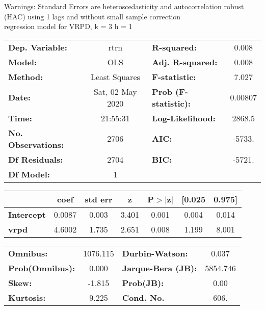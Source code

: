 Warnings: \newline
 [1] Standard Errors are heteroscedasticity and autocorrelation robust (HAC) using 1 lags and without small sample correction\\ 

regression model for VRPD, k = 3 h = 1\begin{center}
\begin{tabular}{lclc}
\toprule
\textbf{Dep. Variable:}    &       rtrn       & \textbf{  R-squared:         } &     0.008   \\
\textbf{Model:}            &       OLS        & \textbf{  Adj. R-squared:    } &     0.008   \\
\textbf{Method:}           &  Least Squares   & \textbf{  F-statistic:       } &     7.027   \\
\textbf{Date:}             & Sat, 02 May 2020 & \textbf{  Prob (F-statistic):} &  0.00807    \\
\textbf{Time:}             &     21:55:31     & \textbf{  Log-Likelihood:    } &    2868.5   \\
\textbf{No. Observations:} &        2706      & \textbf{  AIC:               } &    -5733.   \\
\textbf{Df Residuals:}     &        2704      & \textbf{  BIC:               } &    -5721.   \\
\textbf{Df Model:}         &           1      & \textbf{                     } &             \\
\bottomrule
\end{tabular}
\begin{tabular}{lcccccc}
                   & \textbf{coef} & \textbf{std err} & \textbf{z} & \textbf{P$> |$z$|$} & \textbf{[0.025} & \textbf{0.975]}  \\
\midrule
\textbf{Intercept} &       0.0087  &        0.003     &     3.401  &         0.001        &        0.004    &        0.014     \\
\textbf{vrpd}      &       4.6002  &        1.735     &     2.651  &         0.008        &        1.199    &        8.001     \\
\bottomrule
\end{tabular}
\begin{tabular}{lclc}
\textbf{Omnibus:}       & 1076.115 & \textbf{  Durbin-Watson:     } &    0.037  \\
\textbf{Prob(Omnibus):} &   0.000  & \textbf{  Jarque-Bera (JB):  } & 5854.746  \\
\textbf{Skew:}          &  -1.815  & \textbf{  Prob(JB):          } &     0.00  \\
\textbf{Kurtosis:}      &   9.225  & \textbf{  Cond. No.          } &     606.  \\
\bottomrule
\end{tabular}
\end{center}


